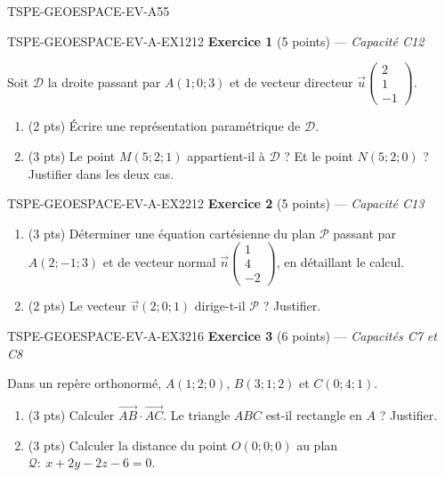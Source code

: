 \begin{evaluation}{TSPE-GEOESPACE-EV-A}{55}

\begin{exercice}{TSPE-GEOESPACE-EV-A-EX1}{2}{12}
\textbf{Exercice 1} (5 points) — \textit{Capacité C12}

\medskip

Soit $\mathcal{D}$ la droite passant par $A(1;0;3)$ et de vecteur directeur
$\vec{u}\begin{pmatrix}2\\1\\-1\end{pmatrix}$.
\begin{enumerate}
  \item (2 pts) Écrire une représentation paramétrique de $\mathcal{D}$.
  \item (3 pts) Le point $M(5;2;1)$ appartient-il à $\mathcal{D}$ ? Et le
        point $N(5;2;0)$ ? Justifier dans les deux cas.
\end{enumerate}
\end{exercice}

\begin{exercice}{TSPE-GEOESPACE-EV-A-EX2}{2}{12}
\textbf{Exercice 2} (5 points) — \textit{Capacité C13}

\medskip

\begin{enumerate}
  \item (3 pts) Déterminer une équation cartésienne du plan $\mathcal{P}$
        passant par $A(2;-1;3)$ et de vecteur normal
        $\vec{n}\begin{pmatrix}1\\4\\-2\end{pmatrix}$, en détaillant le calcul.
  \item (2 pts) Le vecteur $\vec{v}(2;0;1)$ dirige-t-il $\mathcal{P}$ ?
        Justifier.
\end{enumerate}
\end{exercice}

\begin{exercice}{TSPE-GEOESPACE-EV-A-EX3}{2}{16}
\textbf{Exercice 3} (6 points) — \textit{Capacités C7 et C8}

\medskip

Dans un repère orthonormé, $A(1;2;0)$, $B(3;1;2)$ et $C(0;4;1)$.
\begin{enumerate}
  \item (3 pts) Calculer $\vec{AB}\cdot\vec{AC}$. Le triangle $ABC$ est-il
        rectangle en $A$ ? Justifier.
  \item (3 pts) Calculer la distance du point $O(0;0;0)$ au plan
        $\mathcal{Q}:\ x+2y-2z-6=0$.
\end{enumerate}
\end{exercice}


\end{evaluation}
